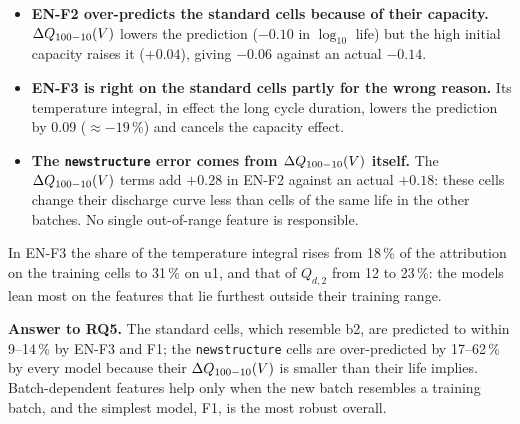 \begin{itemize}
  \item \textbf{EN-F2 over-predicts the standard cells because of their
  capacity.} $\Delta Q_{100-10}(V)$ lowers the prediction ($-0.10$ in $\log_{10}$ life) but
  the high initial capacity raises it ($+0.04$), giving $-0.06$ against an
  actual $-0.14$.
  \item \textbf{EN-F3 is right on the standard cells partly for the wrong
  reason.} Its temperature integral, in effect the long cycle duration,
  lowers the prediction by 0.09 ($\approx-19$\,\%) and cancels the capacity
  effect.
  \item \textbf{The \texttt{newstructure} error comes from $\Delta Q_{100-10}(V)$ itself.}
  The $\Delta Q_{100-10}(V)$ terms add $+0.28$ in EN-F2 against an actual $+0.18$: these cells
  change their discharge curve less than cells of the same life in the other
  batches. No single out-of-range feature is responsible.
\end{itemize}

In EN-F3 the share of the temperature integral rises from 18\,\% of the
attribution on the training cells to 31\,\% on u1, and that of $Q_{d,2}$
from 12 to 23\,\%: the models lean most on the features that lie furthest
outside their training range.

\textbf{Answer to RQ5.} The standard cells, which resemble b2, are
predicted to within 9--14\,\% by EN-F3 and F1; the \texttt{newstructure}
cells are over-predicted by 17--62\,\% by every model because their $\Delta Q_{100-10}(V)$ is
smaller than their life implies. Batch-dependent features help only when the
new batch resembles a training batch, and the simplest model, F1, is the
most robust overall.

